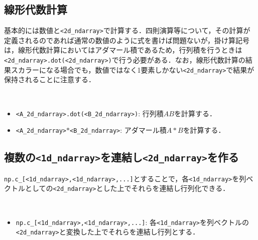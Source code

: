 \subsection{線形代数計算}

基本的には数値と\texttt{<2d\_ndarray>}で計算する．四則演算等について，その計算が定義されるのであれば通常の数値のように式を書けば問題ないが，掛け算記号は，線形代数計算においてはアダマール積であるため，行列積を行うときは\texttt{<2d\_ndarray>.dot(<2d\_ndarray>)}で行う必要がある．なお，線形代数計算の結果スカラーになる場合でも，数値ではなく1要素しかない\texttt{<2d\_ndarray>}で結果が保持されることに注意する．

\begin{gram}　
\begin{itemize}
\item \texttt{<A\_2d\_ndarray>.dot(<B\_2d\_ndarray>)}: 行列積$AB$を計算する．
\item \texttt{<A\_2d\_ndarray>$*$<B\_2d\_ndarray>}: アダマール積$A*B$を計算する．
\end{itemize}
\end{gram}

\begin{cod}[\texttt{num6.py}]　
}]{code/num6.py}
\vspace{-10pt}
\begin{lstlisting}
F=
[[  78  156  234  312]
 [ 177  354  531  708]
 [ 276  552  828 1104]
 [ 375  750 1125 1500]]
G=
[[9040]]
H=
[[ -6  10]
 [ 12 -12]
 [-10   6]]
\end{lstlisting}
\end{cod}
\vspace{-10pt}

\subsection{複数の\texttt{<1d\_ndarray>}を連結し\texttt{<2d\_ndarray>}を作る}

\texttt{np.c\_[<1d\_ndarray>,<1d\_ndarray>,...]}とすることで，各\texttt{<1d\_ndarray>}を列ベクトルとしての\texttt{<2d\_ndarray>}とした上でそれらを連結し行列化できる．

\begin{gram}　
\begin{itemize}
\item \texttt{np.c\_[<1d\_ndarray>,<1d\_ndarray>,...]}: 各\texttt{<1d\_ndarray>}を列ベクトルの\texttt{<2d\_ndarray>}と変換した上でそれらを連結し行列とする．
\end{itemize}
\end{gram}

\begin{cod}[\texttt{num9.py}]　
}]{code/num9.py}
\vspace{-10pt}
\begin{lstlisting}
matrix=
[[ 1 -1]
 [ 2 -2]
 [ 3 -3]
 [ 4 -4]],
shape=(4, 2)
\end{lstlisting}
\end{cod}
\vspace{-10pt}



